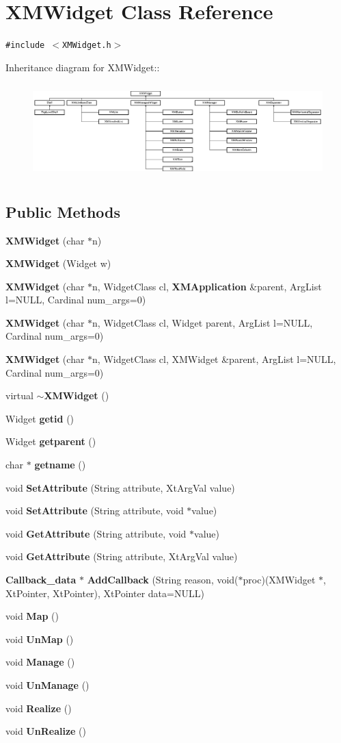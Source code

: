 \section{XMWidget  Class Reference}
\label{classXMWidget}
{\tt \#include $<$XMWidget.h$>$}

Inheritance diagram for XMWidget::\begin{figure}[H]
\begin{center}
\leavevmode
\includegraphics[height=3.66013cm]{classXMWidget}
\end{center}
\end{figure}
\subsection*{Public Methods}
\begin{CompactItemize}
\item 
{\bf XMWidget} (char $\ast$n)
\item 
{\bf XMWidget} (Widget w)
\item 
{\bf XMWidget} (char $\ast$n, Widget\-Class cl, {\bf XMApplication} \&parent, Arg\-List l=NULL, Cardinal num\_\-args=0)
\item 
{\bf XMWidget} (char $\ast$n, Widget\-Class cl, Widget parent, Arg\-List l=NULL, Cardinal num\_\-args=0)
\item 
{\bf XMWidget} (char $\ast$n, Widget\-Class cl, XMWidget \&parent, Arg\-List l=NULL, Cardinal num\_\-args=0)
\item 
virtual {\bf $\sim$XMWidget} ()
\item 
Widget {\bf getid} ()
\item 
Widget {\bf getparent} ()
\item 
char $\ast$ {\bf getname} ()
\item 
void {\bf Set\-Attribute} (String attribute, Xt\-Arg\-Val value)
\item 
void {\bf Set\-Attribute} (String attribute, void $\ast$value)
\item 
void {\bf Get\-Attribute} (String attribute, void $\ast$value)
\item 
void {\bf Get\-Attribute} (String attribute, Xt\-Arg\-Val value)
\item 
{\bf Callback\_\-data} $\ast$ {\bf Add\-Callback} (String reason, void($\ast$proc)(XMWidget $\ast$, Xt\-Pointer, Xt\-Pointer), Xt\-Pointer data=NULL)
\item 
void {\bf Map} ()
\item 
void {\bf Un\-Map} ()
\item 
void {\bf Manage} ()
\item 
void {\bf Un\-Manage} ()
\item 
void {\bf Realize} ()
\item 
void {\bf Un\-Realize} ()
\end{CompactItemize}
